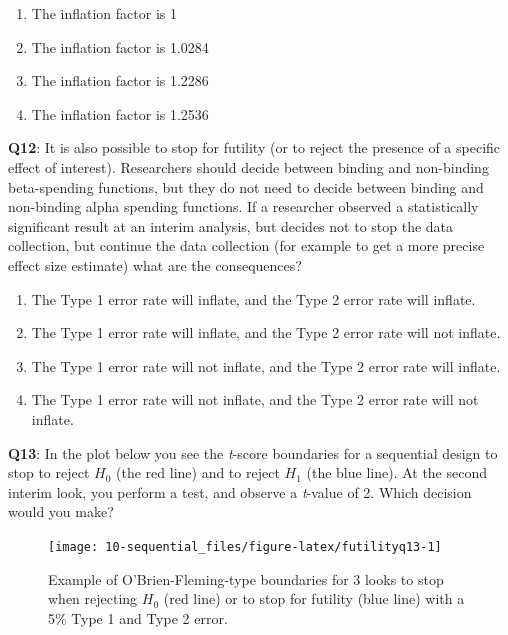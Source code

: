 \documentclass[
  oneside]{book}
\providecommand{\tightlist}{%
  \setlength{\itemsep}{0pt}\setlength{\parskip}{0pt}}
\begin{document}
\begin{enumerate}
\def\labelenumi{\Alph{enumi})}
\tightlist
\item
  The inflation factor is 1
\item
  The inflation factor is 1.0284
\item
  The inflation factor is 1.2286
\item
  The inflation factor is 1.2536
\end{enumerate}

\textbf{Q12}: It is also possible to stop for futility (or to reject the presence of a specific effect of interest). Researchers should decide between binding and non-binding beta-spending functions, but they do not need to decide between binding and non-binding alpha spending functions. If a researcher observed a statistically significant result at an interim analysis, but decides not to stop the data collection, but continue the data collection (for example to get a more precise effect size estimate) what are the consequences?

\begin{enumerate}
\def\labelenumi{\Alph{enumi})}
\tightlist
\item
  The Type 1 error rate will inflate, and the Type 2 error rate will inflate.
\item
  The Type 1 error rate will inflate, and the Type 2 error rate will not inflate.
\item
  The Type 1 error rate will not inflate, and the Type 2 error rate will inflate.
\item
  The Type 1 error rate will not inflate, and the Type 2 error rate will not inflate.
\end{enumerate}

\textbf{Q13}: In the plot below you see the \emph{t}-score boundaries for a sequential design to stop to reject \(H_0\) (the red line) and to reject \(H_1\) (the blue line). At the second interim look, you perform a test, and observe a \emph{t}-value of 2. Which decision would you make?



\begin{figure}

{\centering \texttt{[image: 10-sequential\_files/figure-latex/futilityq13-1]} 

}

\caption{Example of O'Brien-Fleming-type boundaries for 3 looks to stop when rejecting \(H_0\) (red line) or to stop for futility (blue line) with a 5\% Type 1 and Type 2 error.}\label{fig:futilityq13}
\end{figure}
\end{document}

